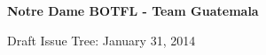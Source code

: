 \documentclass[11pt, landscape]{article}
\begin{document}
\begin{comment}
\bigskip
\vspace{5cm}
\centerline{\Huge \bf Autopilot Design Project}
\bigskip
\vspace{1cm}



\centerline{\Large \bf AME 40451 - Aerospace Dynamics}
\bigskip

\bigskip
\bigskip
\vspace{0cm}
\begin{center}


\noindent Matthew Kudija
\bigskip

\noindent  December 11, 2013
\bigskip

\noindent University of Notre Dame

\noindent \emph{Department of Aerospace \& Mechanical Engineering}

\end{center}

\vspace{2cm}
\newpage
\end{comment}

\begin{center}
\large {\bf{Notre Dame BOTFL - Team Guatemala}}

Draft Issue Tree: January 31, 2014
\end{center}
\end{document}

